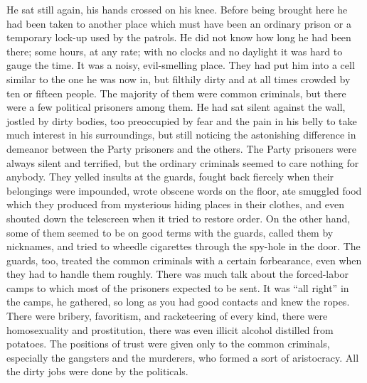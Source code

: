 \begin{paracol}{2}
He sat still again, his hands crossed on his knee. Before being brought
here he had been taken to another place which must have been an ordinary
prison or a temporary lock-up used by the patrols. He did not know how
long he had been there; some hours, at any rate; with no clocks and no
daylight it was hard to gauge the time. It was a noisy, evil-smelling
place. They had put him into a cell similar to the one he was now in,
but filthily dirty and at all times crowded by ten or fifteen people.
The majority of them were common criminals, but there were a few
political prisoners among them. He had sat silent against the wall,
jostled by dirty bodies, too preoccupied by fear and the pain in his
belly to take much interest in his surroundings, but still noticing the
astonishing difference in demeanor between the Party prisoners and the
others. The Party prisoners were always silent and terrified, but the
ordinary criminals seemed to care nothing for anybody. They yelled
insults at the guards, fought back fiercely when their belongings were
impounded, wrote obscene words on the floor, ate smuggled food which
they produced from mysterious hiding places in their clothes, and even
shouted down the telescreen when it tried to restore order. On the other
hand, some of them seemed to be on good terms with the guards, called
them by nicknames, and tried to wheedle cigarettes through the spy-hole
in the door. The guards, too, treated the common criminals with a
certain forbearance, even when they had to handle them roughly. There
was much talk about the forced-labor camps to which most of the
prisoners expected to be sent. It was ``all right'' in the camps, he
gathered, so long as you had good contacts and knew the ropes. There
were bribery, favoritism, and racketeering of every kind, there were
homosexuality and prostitution, there was even illicit alcohol distilled
from potatoes. The positions of trust were given only to the common
criminals, especially the gangsters and the murderers, who formed a sort
of aristocracy. All the dirty jobs were done by the politicals.

\switchcolumn


\end{paracol}
